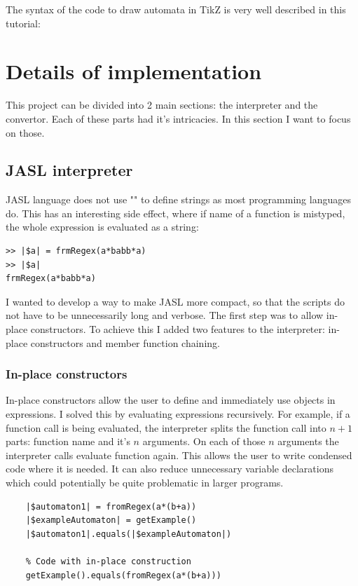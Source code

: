 \documentclass{ctuthesis}
\begin{document}
The syntax of the code to draw automata in TikZ is very well described in this tutorial:~\cite{tikz-tut}

\section{Details of implementation}
This project can be divided into 2 main sections: the interpreter and the convertor. Each of these parts had it's intricacies. In this section I want to focus on those.

\subsection{JASL interpreter}
JASL language does not use "" to define strings as most programming languages do. This has an interesting side effect, where if name of a function is mistyped, the whole expression is evaluated as a string:

\begin{minipage}{\linewidth}
\begin{lstlisting}[language = JASL_snippet]
>> |$a| = frmRegex(a*babb*a)
>> |$a|
frmRegex(a*babb*a)
\end{lstlisting}
\end{minipage}

I wanted to develop a way to make JASL more compact, so that the scripts do not have to be unnecessarily long and verbose. The first step was to allow in-place constructors. To achieve this I added two features to the interpreter: in-place constructors and member function chaining.

\subsubsection{In-place constructors}
In-place constructors allow the user to define and immediately use objects in expressions. I solved this by evaluating expressions recursively. For example, if a function call is being evaluated, the interpreter splits the function call into $n+1$ parts: function name and it's $n$ arguments. On each of those $n$ arguments the interpreter calls evaluate function again. This allows the user to write condensed code where it is needed. It can also reduce unnecessary variable declarations which could potentially be quite problematic in larger programs.

\begin{minipage}{\linewidth}
\begin{lstlisting}[language = JASL]
	% Code without in-place construction
	|$automaton1| = fromRegex(a*(b+a))
	|$exampleAutomaton| = getExample()
	|$automaton1|.equals(|$exampleAutomaton|)
	
	% Code with in-place construction
	getExample().equals(fromRegex(a*(b+a)))
\end{lstlisting}
\end{minipage}
\end{document}
